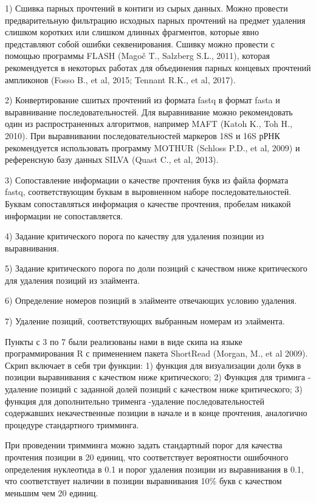 \documentclass[a4paper,12pt,openany,final]{extreport}
\begin{document}
1) Сшивка парных прочтений в контиги из сырых данных. Можно провести
предварительную фильтрацию исходных парных прочтений на предмет удаления
слишком коротких или слишком длинных фрагментов, которые явно
представляют собой ошибки секвенирования. Сшивку можно провести с
помощью программы FLASH (Magoč T., Salzberg S.L., 2011), которая
рекомендуется в некоторых работах для объединения парных концевых
прочтений ампликонов (Fosso B., et al, 2015; Tennant R.K., et al, 2017).

2) Конвертирование сшитых прочтений из формата fastq в формат fasta и
выравнивание последовательностей. Для выравнивание можно рекомендовать
один из распространенных алгоритмов, например MAFT (Katoh K., Toh H.,
2010). При выравнивании последовательностей маркеров 18S и 16S рРНК
рекомендуется использовать программу MOTHUR (Schloss P.D., et al, 2009)
и референсную базу данных SILVA (Quast C., et al, 2013).

3) Сопоставление информации о качестве прочтения букв из файла формата
fastq, соответствующим буквам в выровненном наборе последовательностей.
Буквам сопоставляться информация о качестве прочтения, пробелам никакой
информации не сопоставляется.

4) Задание критического порога по качеству для удаления позиции из
выравнивания.

5) Задание критического порога по доли позиций с качеством ниже
критического для удаления позиций из элаймента.

6) Определение номеров позиций в элайменте отвечающих условию удаления.

7) Удаление позиций, соответствующих выбранным номерам из элаймента.

Пункты с 3 по 7 были реализованы нами в виде скипа на языке
программирования R с применением пакета ShortRead (Morgan, M., et al
2009). Скрип включает в себя три функции: 1) функция для визуализации
доли букв в позиции выравнивания с качеством ниже критического; 2)
Функция для тримига - удаление позиций с заданной долей позиций с
качеством ниже критического; 3) функция для дополнительно трименга
-удаление последовательностей содержавших некачественные позиции в
начале и в конце прочтения, аналогично процедуре стандартного тримминга.

При проведении тримминга можно задать стандартный порог для качества
прочтения позиции в 20 единиц, что соответствует вероятности ошибочного
определения нуклеотида в 0.1 и порог удаления позиции из выравнивания в
0.1, что соответствует наличии в позиции выравнивания 10\% букв с
качеством меньшим чем 20 единиц.
\end{document}
